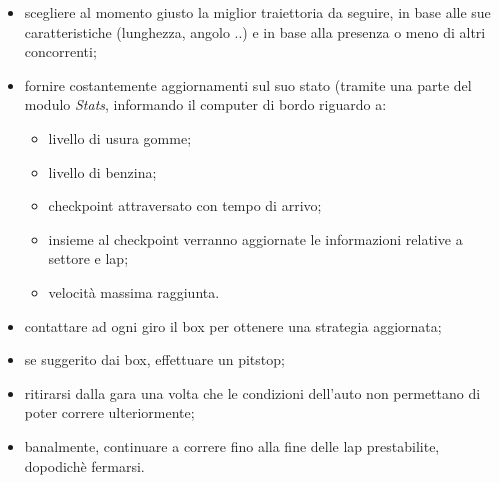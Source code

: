 	\begin{itemize}
		\item scegliere al momento giusto la miglior traiettoria da seguire, in base alle sue caratteristiche (lunghezza, angolo ..)
		 e in base alla presenza o meno di altri concorrenti;
		\item fornire costantemente aggiornamenti sul suo stato (tramite una parte del modulo \emph{Stats}, informando il computer di bordo
			riguardo a:
			\begin{itemize}
				\item livello di usura gomme;
				\item livello di benzina;
				\item checkpoint attraversato con tempo di arrivo;
				\item insieme al checkpoint verranno aggiornate le informazioni relative a settore e lap;
				\item velocit\`{a} massima raggiunta.
			\end{itemize}
		\item contattare ad ogni giro il box per ottenere una strategia aggiornata;
		\item se suggerito dai box, effettuare un pitstop;
		\item ritirarsi dalla gara una volta che le condizioni dell'auto non permettano di poter correre ulteriormente;
		\item banalmente, continuare a correre fino alla fine delle lap prestabilite, dopodich\`{e} fermarsi.
	\end{itemize}
